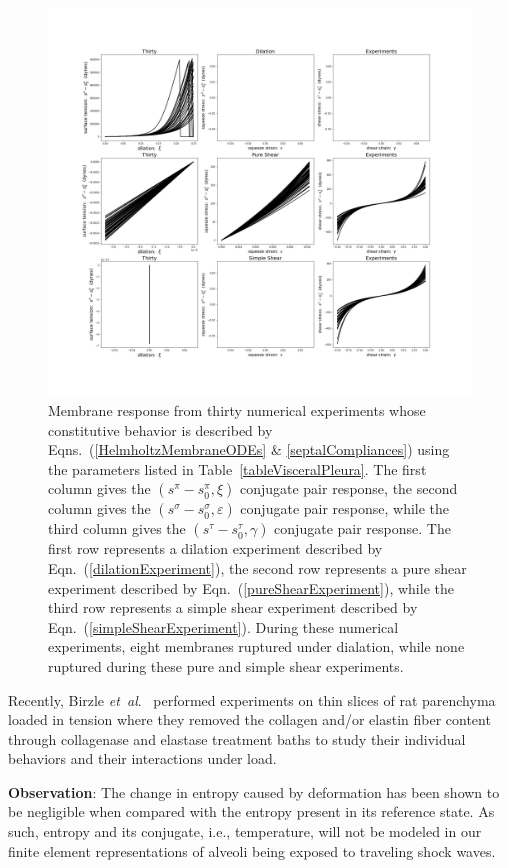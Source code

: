 \begin{figure}
    \mbox{} \hspace{-25mm}
    \includegraphics[width=1.3\textwidth]{figures/septalMembranes.jpg}
    \caption{Membrane response from thirty numerical experiments whose constitutive behavior is described by Eqns.~(\ref{HelmholtzMembraneODEs} \& \ref{septalCompliances}) using the parameters listed in Table~\ref{tableVisceralPleura}. The first column gives the $( s^{\pi} \! - \! s_0^{\pi} , \xi)$ conjugate pair response, the second column gives the $( s^{\sigma} \! - s_0^{\sigma} , \varepsilon)$ conjugate pair response, while the third column gives the $( s^{\tau} \! - \! s_0^{\tau} , \gamma)$ conjugate pair response.  The first row represents a dilation experiment described by Eqn.~(\ref{dilationExperiment}), the second row represents a pure shear experiment described by Eqn.~(\ref{pureShearExperiment}), while the third row represents a simple shear experiment described by Eqn.~(\ref{simpleShearExperiment}).  During these numerical experiments, eight membranes ruptured under dialation, while none ruptured during these pure and simple shear experiments.}
    \label{figStressStrainMembranes}
\end{figure}

Recently, Birzle \textit{et~al}.\ \cite{Birzleetal19} performed experiments on thin slices of rat parenchyma loaded in tension where they removed the collagen and\slash or elastin fiber content through collagenase and elastase treatment baths to study their individual behaviors and their interactions under load.

\textbf{Observation}: The change in entropy caused by deformation has been shown to be negligible when compared with the entropy present in its reference state.  As such, entropy and its conjugate, i.e., temperature, will not be modeled in our finite element representations of alveoli being exposed to traveling shock waves.
